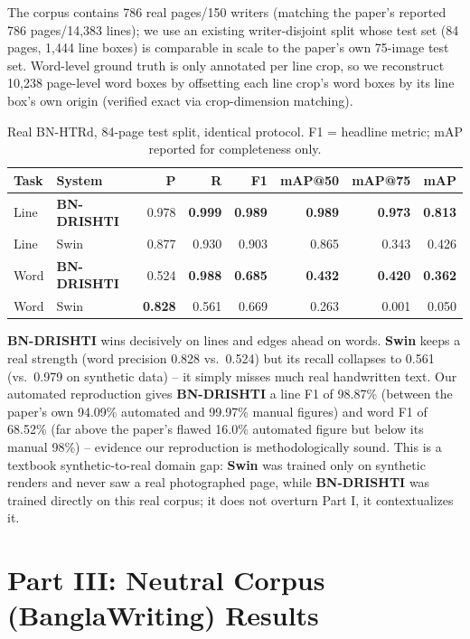 \documentclass[10pt]{article}
\newcommand{\swin}{\textbf{Swin}}
\newcommand{\bnd}{\textbf{BN-DRISHTI}}
\begin{document}
The corpus contains 786 real pages/150 writers (matching the paper's reported 786
pages/14{,}383 lines); we use an existing writer-disjoint split whose test set (84
pages, 1{,}444 line boxes) is comparable in scale to the paper's own 75-image test set.
Word-level ground truth is only annotated per line crop, so we reconstruct 10{,}238
page-level word boxes by offsetting each line crop's word boxes by its line box's own
origin (verified exact via crop-dimension matching).

\begin{table}[H]
\centering
\footnotesize
\caption{Real BN-HTRd, 84-page test split, identical protocol. F1 = headline metric;
mAP reported for completeness only.}
\begin{tabular}{@{}llrrrrrr@{}}
\toprule
Task & System & P & R & F1 & mAP@50 & mAP@75 & mAP \\
\midrule
Line & \textbf{\bnd{}} & 0.978 & \textbf{0.999} & \textbf{0.989} & \textbf{0.989} & \textbf{0.973} & \textbf{0.813} \\
Line & Swin & 0.877 & 0.930 & 0.903 & 0.865 & 0.343 & 0.426 \\
Word & \bnd{}     & 0.524 & \textbf{0.988} & \textbf{0.685} & \textbf{0.432} & \textbf{0.420} & \textbf{0.362} \\
Word & Swin & \textbf{0.828} & 0.561 & 0.669 & 0.263 & 0.001 & 0.050 \\
\bottomrule
\end{tabular}
\end{table}

\bnd{} wins decisively on lines and edges ahead on words. \swin{} keeps a real
strength (word precision 0.828 vs.\ 0.524) but its recall collapses to 0.561 (vs.\
0.979 on synthetic data) -- it simply misses much real handwritten text. Our
automated reproduction gives \bnd{} a line F1 of 98.87\% (between the paper's own
94.09\% automated and 99.97\% manual figures) and word F1 of 68.52\% (far above the
paper's flawed 16.0\% automated figure but below its manual 98\%) -- evidence our
reproduction is methodologically sound. This is a textbook synthetic-to-real domain
gap: \swin{} was trained only on synthetic renders and never saw a real photographed
page, while \bnd{} was trained directly on this real corpus; it does not overturn Part
I, it contextualizes it.

\section{Part III: Neutral Corpus (BanglaWriting) Results}
\end{document}
